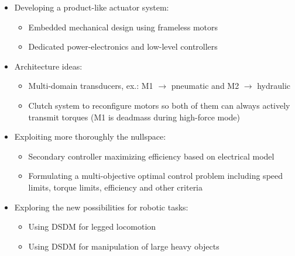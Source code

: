 \begin{itemize}
		\item Developing a product-like actuator system:
		\begin{itemize}
			\item Embedded mechanical design using frameless motors
			\item Dedicated power-electronics and low-level controllers
		\end{itemize}
		\item Architecture ideas:
		\begin{itemize}
			\item Multi-domain transducers, ex.: M1 $\rightarrow$ pneumatic and M2 $\rightarrow$ hydraulic
			\item Clutch system to reconfigure motors so both of them can always actively transmit torques (M1 is deadmass during high-force mode)
		\end{itemize}
		\item Exploiting more thoroughly the nullspace:
		\begin{itemize}
			\item Secondary controller maximizing efficiency based on electrical model
			\item Formulating a multi-objective optimal control problem including speed limits, torque limits, efficiency and other criteria 
		\end{itemize}
		\item Exploring the new possibilities for robotic tasks:
		\begin{itemize}
			\item Using DSDM for legged locomotion
			\item Using DSDM for manipulation of large heavy objects
		\end{itemize}
\end{itemize}